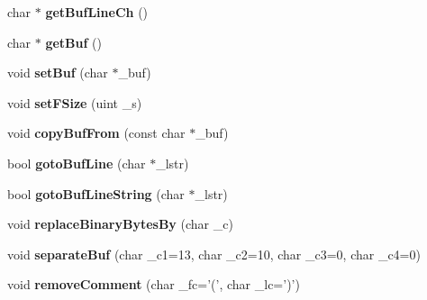 \begin{DoxyCompactItemize}
\item 
\hypertarget{classRS__FilterDXF1_a63dde1e48dedd57f3af111b3c774448a}{char $\ast$ {\bfseries get\-Buf\-Line\-Ch} ()}\label{classRS__FilterDXF1_a63dde1e48dedd57f3af111b3c774448a}

\item 
\hypertarget{classRS__FilterDXF1_a67eb454cf2cb4354005025f4b01a322e}{char $\ast$ {\bfseries get\-Buf} ()}\label{classRS__FilterDXF1_a67eb454cf2cb4354005025f4b01a322e}

\item 
\hypertarget{classRS__FilterDXF1_a9aded2ae05029875dde78516a846dd77}{void {\bfseries set\-Buf} (char $\ast$\-\_\-buf)}\label{classRS__FilterDXF1_a9aded2ae05029875dde78516a846dd77}

\item 
\hypertarget{classRS__FilterDXF1_a2ccbcc66435ebeeecfeb088287900d51}{void {\bfseries set\-F\-Size} (uint \-\_\-s)}\label{classRS__FilterDXF1_a2ccbcc66435ebeeecfeb088287900d51}

\item 
\hypertarget{classRS__FilterDXF1_a48e25d8ba8788cabdd897ae96834db98}{void {\bfseries copy\-Buf\-From} (const char $\ast$\-\_\-buf)}\label{classRS__FilterDXF1_a48e25d8ba8788cabdd897ae96834db98}

\item 
\hypertarget{classRS__FilterDXF1_af8829900057b8469dd1e5a17b6eab769}{bool {\bfseries goto\-Buf\-Line} (char $\ast$\-\_\-lstr)}\label{classRS__FilterDXF1_af8829900057b8469dd1e5a17b6eab769}

\item 
\hypertarget{classRS__FilterDXF1_a50e49531e3a9b793c98d59b3522e33ab}{bool {\bfseries goto\-Buf\-Line\-String} (char $\ast$\-\_\-lstr)}\label{classRS__FilterDXF1_a50e49531e3a9b793c98d59b3522e33ab}

\item 
\hypertarget{classRS__FilterDXF1_a2df7b20a16d0c3a6835f011999091752}{void {\bfseries replace\-Binary\-Bytes\-By} (char \-\_\-c)}\label{classRS__FilterDXF1_a2df7b20a16d0c3a6835f011999091752}

\item 
\hypertarget{classRS__FilterDXF1_a6e43e96c833d1b70f3ed91c7e8081711}{void {\bfseries separate\-Buf} (char \-\_\-c1=13, char \-\_\-c2=10, char \-\_\-c3=0, char \-\_\-c4=0)}\label{classRS__FilterDXF1_a6e43e96c833d1b70f3ed91c7e8081711}

\item 
\hypertarget{classRS__FilterDXF1_a7a1f217c32ca5aec82202315dce33c6e}{void {\bfseries remove\-Comment} (char \-\_\-fc='(', char \-\_\-lc=')')}\label{classRS__FilterDXF1_a7a1f217c32ca5aec82202315dce33c6e}


\end{DoxyCompactItemize}
